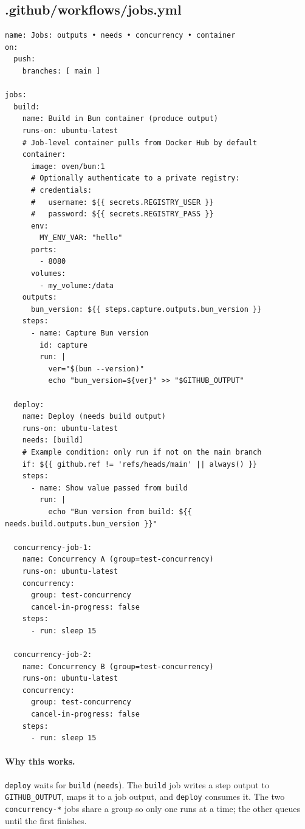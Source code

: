 \documentclass[11pt]{article}
\begin{document}
\subsection*{.github/workflows/jobs.yml}
\begin{verbatim}
name: Jobs: outputs • needs • concurrency • container
on:
  push:
    branches: [ main ]

jobs:
  build:
    name: Build in Bun container (produce output)
    runs-on: ubuntu-latest
    # Job-level container pulls from Docker Hub by default
    container:
      image: oven/bun:1
      # Optionally authenticate to a private registry:
      # credentials:
      #   username: ${{ secrets.REGISTRY_USER }}
      #   password: ${{ secrets.REGISTRY_PASS }}
      env:
        MY_ENV_VAR: "hello"
      ports:
        - 8080
      volumes:
        - my_volume:/data
    outputs:
      bun_version: ${{ steps.capture.outputs.bun_version }}
    steps:
      - name: Capture Bun version
        id: capture
        run: |
          ver="$(bun --version)"
          echo "bun_version=${ver}" >> "$GITHUB_OUTPUT"

  deploy:
    name: Deploy (needs build output)
    runs-on: ubuntu-latest
    needs: [build]
    # Example condition: only run if not on the main branch
    if: ${{ github.ref != 'refs/heads/main' || always() }}
    steps:
      - name: Show value passed from build
        run: |
          echo "Bun version from build: ${{ needs.build.outputs.bun_version }}"

  concurrency-job-1:
    name: Concurrency A (group=test-concurrency)
    runs-on: ubuntu-latest
    concurrency:
      group: test-concurrency
      cancel-in-progress: false
    steps:
      - run: sleep 15

  concurrency-job-2:
    name: Concurrency B (group=test-concurrency)
    runs-on: ubuntu-latest
    concurrency:
      group: test-concurrency
      cancel-in-progress: false
    steps:
      - run: sleep 15
\end{verbatim}

\paragraph{Why this works.}
\texttt{deploy} waits for \texttt{build} (\texttt{needs}). The \texttt{build} job writes a step output to \texttt{GITHUB\_OUTPUT}, maps it to a job output, and \texttt{deploy} consumes it. The two \texttt{concurrency-*} jobs share a group so only one runs at a time; the other queues until the first finishes.
\end{document}
